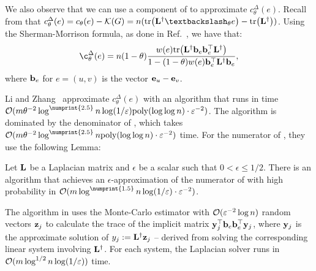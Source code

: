 We also observe that we can use a component of  to approximate
$c_{\theta}^{\Delta}(e)$. Recall from  that
$c_{\theta}^{\Delta}(e) = c_{\theta}(e) - \kidx(G) = n(\tr{\Linv\textbackslash_{\theta}e} - \tr{\Linv})$.
Using the Sherman-Morrison formula, as done in Ref.~\cite{DBLP:conf/soda/LiZ18}, we have that:
%
\begin{equation}
\label{eq:el-clos:edge-cent-sm}
\c_{\theta}^{\Delta}(e) =
n(1 - \theta)\frac{w(e)\tr{\Linv\vect{b}_e\vect{b}_e^\top\Linv}}{1 - (1 - \theta)w(e)\vect{b}_e^\top\Linv\vect{b}_e},
\end{equation}
%
where $\mathbf{b}_e$ for $e = (u, v)$ is the vector $\mathbf{e}_{u} - \mathbf{e}_{v}$.

Li and Zhang~\cite{DBLP:conf/soda/LiZ18} approximate $c_{\theta}^{\Delta}(e)$ with an algorithm that runs
in time $\Oh(m\theta^{-2}\log^{\numprint{2.5}}n\log(1/\epsilon)\poly(\log\log n)\cdot\epsilon^{-2})$.
The algorithm is dominated by the denominator of , which takes
$\Oh(m\theta^{-2}\log^{\numprint{2.5}}n\poly(\log\log n)\cdot\epsilon^{-2})$ time.
For the numerator of , they use the following Lemma:

\begin{lemma}
\label{lemma:el-clos:edge-cent-num}
Let $\mathbf{L}$ be a Laplacian matrix and $\epsilon$ be a scalar such that $0 < \epsilon \le 1/2$.
There is an algorithm that achieves an $\epsilon$-approximation of the
numerator of  with high probability in
$\Oh(m\log^{\numprint{1.5}}n\log(1/\epsilon)\cdot\epsilon^{-2})$.
\end{lemma}

The algorithm in  uses the Monte-Carlo estimator with
$\mathcal{O}(\varepsilon^{-2}\log n)$ random vectors $\mathbf{z}_j$ to calculate the trace of the implicit
matrix $\mathbf{y}_j^\top\mathbf{b}_e\mathbf{b}_e^\top\mathbf{y}_j$, where $\mathbf{y}_j$ is the
approximate solution of $y_j := \mathbf{L}^\dagger\mathbf{z}_j$ -- derived from solving the corresponding
linear system involving $\mathbf{L}^\dagger$.
For each system, the Laplacian solver runs in $\mathcal{O}(m\log^{1/2}n \log(1/\varepsilon))$ time.

